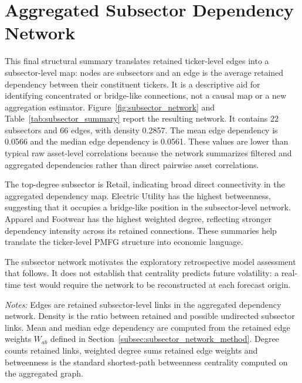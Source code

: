 \section{Aggregated Subsector Dependency Network}
\label{sec:subsector_network}

This final structural summary translates retained ticker-level edges into a subsector-level map: nodes are subsectors and an edge is the average retained dependency between their constituent tickers. It is a descriptive aid for identifying concentrated or bridge-like connections, not a causal map or a new aggregation estimator. Figure~\ref{fig:subsector_network} and Table~\ref{tab:subsector_summary} report the resulting network. It contains 22 subsectors and 66 edges, with density 0.2857. The mean edge dependency is 0.0566 and the median edge dependency is 0.0561. These values are lower than typical raw asset-level correlations because the network summarizes filtered and aggregated dependencies rather than direct pairwise asset correlations.

The top-degree subsector is Retail, indicating broad direct connectivity in the aggregated dependency map. Electric Utility has the highest betweenness, suggesting that it occupies a bridge-like position in the subsector-level network. Apparel and Footwear has the highest weighted degree, reflecting stronger dependency intensity across its retained connections. These summaries help translate the ticker-level PMFG structure into economic language.

The subsector network motivates the exploratory retrospective model assessment that follows. It does not establish that centrality predicts future volatility: a real-time test would require the network to be reconstructed at each forecast origin.


\begin{center}
\label{tab:subsector_summary}
\end{center}
\noindent\footnotesize\emph{Notes:} Edges are retained subsector-level links in the aggregated dependency network. Density is the ratio between retained and possible undirected subsector links. Mean and median edge dependency are computed from the retained edge weights $W_{ab}$ defined in Section~\ref{subsec:subsector_network_method}. Degree counts retained links, weighted degree sums retained edge weights and betweenness is the standard shortest-path betweenness centrality computed on the aggregated graph.
\GlobalPrecisionNote

